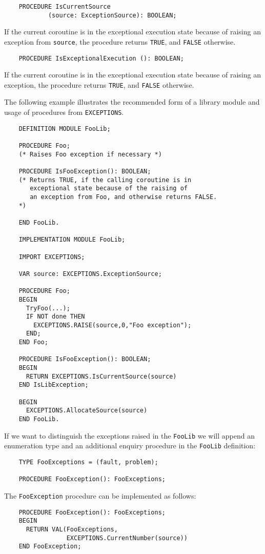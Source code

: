 \begin{verbatim}
    PROCEDURE IsCurrentSource
            (source: ExceptionSource): BOOLEAN;
\end{verbatim}

If the current coroutine is in the exceptional execution state
because of raising an exception from \verb'source',
the procedure returns \verb'TRUE', and \verb'FALSE' otherwise.

\verb'    PROCEDURE IsExceptionalExecution (): BOOLEAN;'

If the current coroutine is in the exceptional execution state
because of raising an exception, the procedure returns \verb'TRUE', and
\verb'FALSE' otherwise.

The following example illustrates the recommended form of a library
module and usage of procedures from {\tt EXCEPTIONS}.
\begin{verbatim}
    DEFINITION MODULE FooLib;

    PROCEDURE Foo;
    (* Raises Foo exception if necessary *)

    PROCEDURE IsFooException(): BOOLEAN;
    (* Returns TRUE, if the calling coroutine is in
       exceptional state because of the raising of
       an exception from Foo, and otherwise returns FALSE.
    *)

    END FooLib.

    IMPLEMENTATION MODULE FooLib;

    IMPORT EXCEPTIONS;

    VAR source: EXCEPTIONS.ExceptionSource;

    PROCEDURE Foo;
    BEGIN
      TryFoo(...);
      IF NOT done THEN
        EXCEPTIONS.RAISE(source,0,"Foo exception");
      END;
    END Foo;

    PROCEDURE IsFooException(): BOOLEAN;
    BEGIN
      RETURN EXCEPTIONS.IsCurrentSource(source)
    END IsLibException;

    BEGIN
      EXCEPTIONS.AllocateSource(source)
    END FooLib.
\end{verbatim}

If we want to distinguish the exceptions raised in the {\tt FooLib}
we will append an enumeration type and an additional
enquiry procedure in the {\tt FooLib} definition:
\begin{verbatim}
    TYPE FooExceptions = (fault, problem);

    PROCEDURE FooException(): FooExceptions;
\end{verbatim}
The {\tt FooException} procedure can be implemented as follows:
\begin{verbatim}
    PROCEDURE FooException(): FooExceptions;
    BEGIN
      RETURN VAL(FooExceptions,
                 EXCEPTIONS.CurrentNumber(source))
    END FooException;
\end{verbatim}

